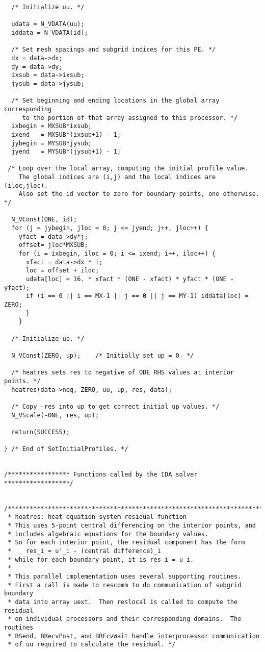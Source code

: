 \begin{verbatim}
  /* Initialize uu. */ 

  udata = N_VDATA(uu);
  iddata = N_VDATA(id);

  /* Set mesh spacings and subgrid indices for this PE. */
  dx = data->dx;
  dy = data->dy;
  ixsub = data->ixsub;
  jysub = data->jysub;

  /* Set beginning and ending locations in the global array corresponding 
     to the portion of that array assigned to this processor. */
  ixbegin = MXSUB*ixsub;
  ixend   = MXSUB*(ixsub+1) - 1;
  jybegin = MYSUB*jysub;
  jyend   = MYSUB*(jysub+1) - 1;

 /* Loop over the local array, computing the initial profile value.
    The global indices are (i,j) and the local indices are (iloc,jloc).
    Also set the id vector to zero for boundary points, one otherwise. */

  N_VConst(ONE, id);
  for (j = jybegin, jloc = 0; j <= jyend; j++, jloc++) {
    yfact = data->dy*j;
    offset= jloc*MXSUB;
    for (i = ixbegin, iloc = 0; i <= ixend; i++, iloc++) {
      xfact = data->dx * i;
      loc = offset + iloc;
      udata[loc] = 16. * xfact * (ONE - xfact) * yfact * (ONE - yfact);
      if (i == 0 || i == MX-1 || j == 0 || j == MY-1) iddata[loc] = ZERO;
      }
    }

  /* Initialize up. */

  N_VConst(ZERO, up);    /* Initially set up = 0. */

  /* heatres sets res to negative of ODE RHS values at interior points. */
  heatres(data->neq, ZERO, uu, up, res, data);

  /* Copy -res into up to get correct initial up values. */
  N_VScale(-ONE, res, up);

  return(SUCCESS);

} /* End of SetInitialProfiles. */


/***************** Functions called by the IDA solver ******************/


/*************************************************************************
 * heatres: heat equation system residual function                       
 * This uses 5-point central differencing on the interior points, and    
 * includes algebraic equations for the boundary values.                 
 * So for each interior point, the residual component has the form       
 *    res_i = u'_i - (central difference)_i                              
 * while for each boundary point, it is res_i = u_i. 
 *                    
 * This parallel implementation uses several supporting routines. 
 * First a call is made to rescomm to do communication of subgrid boundary
 * data into array uext.  Then reslocal is called to compute the residual
 * on individual processors and their corresponding domains.  The routines
 * BSend, BRecvPost, and BREcvWait handle interprocessor communication
 * of uu required to calculate the residual. */


\end{verbatim}
